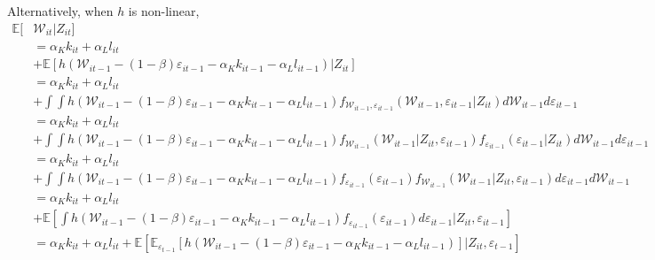 \documentclass[
  12pt]{article}
\theoremstyle{definition}
\theoremstyle{remark}
\begin{document}
Alternatively, when \(h\) is non-linear, \[
\begin{aligned}    
 \mathbb{E}[&\mathcal{W}_{it}|Z_{it}]\\
 &=\alpha_K k_{it}+\alpha_L l_{it}\\
 &+\mathbb{E}\left[ h(\mathcal W_{it-1}-(1-\beta)\varepsilon_{it-1}-\alpha_K k_{it-1}-\alpha_L l_{it-1})|Z_{it}\right]\\
 &=\alpha_K k_{it}+\alpha_L l_{it}\\
 &+\int\int h(\mathcal W_{it-1}-(1-\beta)\varepsilon_{it-1}-\alpha_K k_{it-1}-\alpha_L l_{it-1})f_{\mathcal{W}_{it-1},\varepsilon_{it-1}}(\mathcal{W}_{it-1},\varepsilon_{it-1}|Z_{it})d\mathcal{W}_{it-1}d\varepsilon_{it-1}\\
  &=\alpha_K k_{it}+\alpha_L l_{it}\\
 &+\int\int h(\mathcal W_{it-1}-(1-\beta)\varepsilon_{it-1}-\alpha_K k_{it-1}-\alpha_L l_{it-1})f_{\mathcal{W}_{it-1}}(\mathcal{W}_{it-1}|Z_{it},\varepsilon_{it-1})f_{\varepsilon_{it-1}}(\varepsilon_{it-1}|Z_{it})d\mathcal{W}_{it-1}d\varepsilon_{it-1}\\
  &=\alpha_K k_{it}+\alpha_L l_{it}\\
 &+\int\int h(\mathcal W_{it-1}-(1-\beta)\varepsilon_{it-1}-\alpha_K k_{it-1}-\alpha_L l_{it-1})f_{\varepsilon_{it-1}}(\varepsilon_{it-1})f_{\mathcal{W}_{it-1}}(\mathcal{W}_{it-1}|Z_{it},\varepsilon_{it-1})d\varepsilon_{it-1} d\mathcal{W}_{it-1}\\
 &=\alpha_K k_{it}+\alpha_L l_{it}\\
 &+\mathbb{E}\left[\int h(\mathcal W_{it-1}-(1-\beta)\varepsilon_{it-1}-\alpha_K k_{it-1}-\alpha_L l_{it-1})f_{\varepsilon_{it-1}}(\varepsilon_{it-1})d\varepsilon_{it-1}|Z_{it},\varepsilon_{it-1}\right]\\
 &=\alpha_K k_{it}+\alpha_L l_{it}+\mathbb{E}\left[\mathbb{E}_{\varepsilon_{t-1}}[ h(\mathcal W_{it-1}-(1-\beta)\varepsilon_{it-1}-\alpha_K k_{it-1}-\alpha_L l_{it-1})]|Z_{it},\varepsilon_{t-1}\right]\\
\end{aligned}
\]
\end{document}
